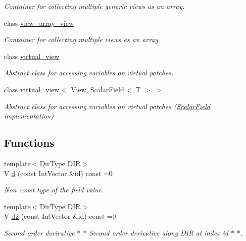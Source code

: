 \begin{DoxyCompactItemize}
\begin{DoxyCompactList}\small\item\em Container for collecting multiple generic views as an array. \end{DoxyCompactList}\item 
class \hyperlink{classUintah_1_1PhaseField_1_1detail_1_1view__array__view}{view\+\_\+array\+\_\+view}
\begin{DoxyCompactList}\small\item\em Container for collecting multiple views as an array. \end{DoxyCompactList}\item 
class \hyperlink{classUintah_1_1PhaseField_1_1detail_1_1virtual__view}{virtual\+\_\+view}
\begin{DoxyCompactList}\small\item\em Abstract class for accessing variables on virtual patches. \end{DoxyCompactList}\item 
class \hyperlink{classUintah_1_1PhaseField_1_1detail_1_1virtual__view_3_01View_00_01ScalarField_3_01T_01_4_01_4}{virtual\+\_\+view$<$ View, Scalar\+Field$<$ T $>$ $>$}
\begin{DoxyCompactList}\small\item\em Abstract class for accessing variables on virtual patches (\hyperlink{structUintah_1_1PhaseField_1_1ScalarField}{Scalar\+Field} implementation) \end{DoxyCompactList}\end{DoxyCompactItemize}
\subsection*{Functions}
\begin{DoxyCompactItemize}
\item 
{\footnotesize template$<$Dir\+Type D\+IR$>$ }\\V \hyperlink{namespaceUintah_1_1PhaseField_1_1detail_a668f64c95b8c2526195f4318be283e11}{d} (const Int\+Vector \&id) const =0
\begin{DoxyCompactList}\small\item\em Non const type of the field value. \end{DoxyCompactList}\item 
{\footnotesize template$<$Dir\+Type D\+IR$>$ }\\V \hyperlink{namespaceUintah_1_1PhaseField_1_1detail_aa16b629683ac039c2ea8bcc553216fb5}{d2} (const Int\+Vector \&id) const =0
\begin{DoxyCompactList}\small\item\em Second order derivative $\ast$ $\ast$ Second order derivative along D\+IR at index id $\ast$ $\ast$. \end{DoxyCompactList}\end{DoxyCompactItemize}


